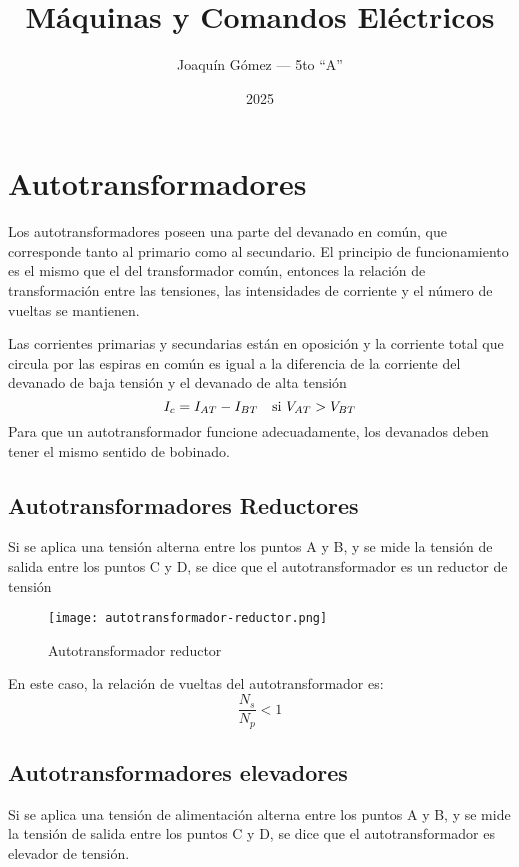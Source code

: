\documentclass[11pt]{report}
\title{Máquinas y Comandos Eléctricos}
\author{Joaquín Gómez --- 5to ``A''}
\date{2025}
\begin{document}
\maketitle

\chapter{Autotransformadores}
Los autotransformadores poseen una parte del devanado en común, que corresponde tanto al 
primario como al secundario. 
El principio de funcionamiento es el mismo que el del transformador común, entonces la relación de 
transformación entre las tensiones, las intensidades de corriente y el número de vueltas se mantienen.

Las corrientes primarias y secundarias están en oposición y la corriente total que circula por las espiras
en común es igual a la diferencia de la corriente del devanado de baja tensión y el devanado de alta tensión
\begin{equation}
    I_c = I_{AT} - I_{BT} \quad \textnormal{si } V_{AT} > V_{BT}   
\end{equation}
Para que un autotransformador funcione adecuadamente, los devanados deben tener el mismo sentido de bobinado.

\section{Autotransformadores Reductores}
Si se aplica una tensión alterna entre los puntos A y B, y se mide la tensión de salida entre los puntos C y D,
se dice que el autotransformador es un reductor de tensión

\begin{figure}[h]
    \begin{center}
        \texttt{[image: autotransformador-reductor.png]}
    \end{center}
    \caption{Autotransformador reductor}
\end{figure}

En este caso, la relación de vueltas del autotransformador es:
\begin{equation}
    \frac{N_s}{N_p} < 1 
\end{equation}

\section{Autotransformadores elevadores}
Si se aplica una tensión de alimentación alterna entre los puntos A y B, y se mide la tensión de salida entre los puntos C y D, se dice que el autotransformador es elevador de tensión.
\end{document}
